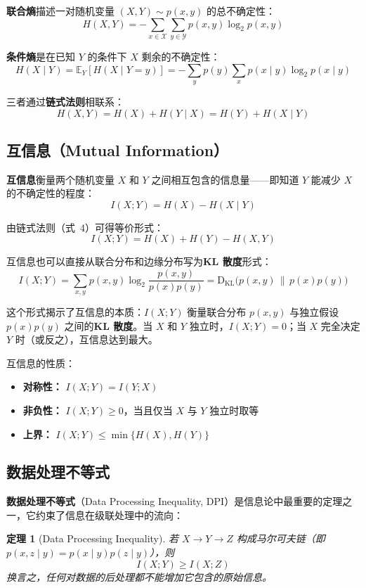 \documentclass[11pt,a4paper]{article}
\newtheorem{theorem}{定理}
\newcommand{\E}{\mathbb{E}}
\newcommand{\KL}{\operatorname{D_{KL}}}
\begin{document}
\textbf{联合熵}描述一对随机变量 $(X,Y) \sim p(x,y)$ 的总不确定性：
\[
H(X,Y) = -\sum_{x \in \mathcal{X}} \sum_{y \in \mathcal{Y}} p(x,y) \log_2 p(x,y)
\tag{2}
\]

\textbf{条件熵}是在已知 $Y$ 的条件下 $X$ 剩余的不确定性：
\[
H(X \mid Y) = \E_Y\left[H(X \mid Y=y)\right] = -\sum_{y} p(y) \sum_{x} p(x \mid y) \log_2 p(x \mid y)
\tag{3}
\]

三者通过\textbf{链式法则}相联系：
\[
H(X,Y) = H(X) + H(Y \mid X) = H(Y) + H(X \mid Y)
\tag{4}
\]

\subsection{互信息（Mutual Information）}

\textbf{互信息}衡量两个随机变量 $X$ 和 $Y$ 之间相互包含的信息量——即知道 $Y$ 能减少 $X$ 的不确定性的程度：
\[
I(X;Y) = H(X) - H(X \mid Y)
\tag{5}
\]

由链式法则（式~4）可得等价形式：
\[
I(X;Y) = H(X) + H(Y) - H(X,Y)
\tag{6}
\]

互信息也可以直接从联合分布和边缘分布写为\textbf{KL 散度}形式：
\[
I(X;Y) = \sum_{x,y} p(x,y) \log_2 \frac{p(x,y)}{p(x)p(y)}
       = \KL\bigl(p(x,y) \,\|\, p(x)p(y)\bigr)
\tag{7}
\]

这个形式揭示了互信息的本质：$I(X;Y)$ 衡量联合分布 $p(x,y)$ 与独立假设 $p(x)p(y)$ 之间的\textbf{KL 散度}。当 $X$ 和 $Y$ 独立时，$I(X;Y)=0$；当 $X$ 完全决定 $Y$ 时（或反之），互信息达到最大。

互信息的性质：
\begin{itemize}[noitemsep]
  \item \textbf{对称性：} $I(X;Y) = I(Y;X)$
  \item \textbf{非负性：} $I(X;Y) \geq 0$，当且仅当 $X$ 与 $Y$ 独立时取等
  \item \textbf{上界：} $I(X;Y) \leq \min\{H(X), H(Y)\}$
\end{itemize}

\subsection{数据处理不等式}

\textbf{数据处理不等式}（Data Processing Inequality, DPI）是信息论中最重要的定理之一，它约束了信息在级联处理中的流向：

\begin{theorem}[Data Processing Inequality]
  若 $X \to Y \to Z$ 构成马尔可夫链（即 $p(x,z \mid y) = p(x \mid y)p(z \mid y)$），则
  \[
  I(X;Y) \geq I(X;Z)
  \tag{8}
  \]
  换言之，任何对数据的后处理都不能增加它包含的原始信息。
\end{theorem}
\end{document}
